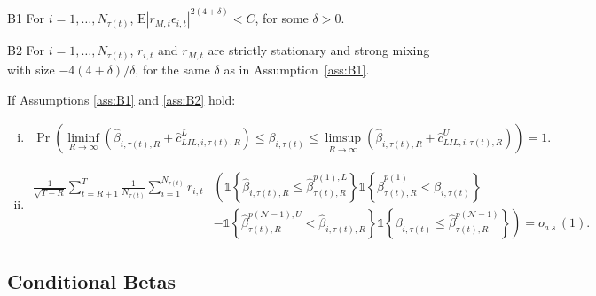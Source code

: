 \begin{namedassumption}{B1}\label{ass:B1}
For $i=1,\ldots,N_{\tau(t)}$, $\mathrm{E}\left|r_{M,t}\epsilon_{i,t}\right|^{2(4+\delta)}<C$, for some $\delta>0$.
\end{namedassumption}

\begin{namedassumption}{B2}\label{ass:B2}
For $i=1,\ldots,N_{\tau(t)}$, $r_{i,t}$ and $r_{M,t}$ are strictly stationary
and strong mixing with size $-4(4+\delta)/\delta$, for the same $\delta$ as in
Assumption~\ref{ass:B1}.
\end{namedassumption}

\begin{propositionB}\label{prop:B}
If Assumptions \ref{ass:B1} and \ref{ass:B2} hold:
\begin{enumerate}[(i)]
\item
\begin{align*}
\Pr\!\left( \liminf_{R\to\infty} \left(\widehat{\beta}_{i,\tau(t),R}+\widehat{c}^{L}_{LIL,i,\tau(t),R}\right) \le \beta_{i,\tau(t)} \le \limsup_{R\to\infty} \left(\widehat{\beta}_{i,\tau(t),R}+\widehat{c}^{U}_{LIL,i,\tau(t),R}\right) \right)=1.
\end{align*}

\item
\begin{align*}
    \frac{1}{\sqrt{T-R}}\sum_{t=R+1}^{T} \frac{1}{N_{\tau(t)}}\sum_{i=1}^{N_{\tau(t)}} r_{i,t} &\left( \mathds{1}\!\left\{ \widehat{\beta}_{i,\tau(t),R} \leq \widehat{\beta}_{\tau(t),R}^{p(1),L} \right\} \mathds{1}\!\left\{ \widehat{\beta}_{\tau(t),R}^{p(1)} < \beta_{i,\tau(t)} \right\} \right. \\
    &\left. - \mathds{1} \left\{ \widehat{\beta}_{\tau(t),R}^{p(\mathcal N-1),U} < \widehat{\beta}_{i,\tau(t),R} \right\} \mathds{1}\!\left\{ \beta_{i,\tau(t)} \leq \widehat{\beta}_{\tau(t),R}^{p(\mathcal N-1)} \right\} \right) = o_{a.s.}(1).
\end{align*}
\end{enumerate}
\end{propositionB}

\subsection{Conditional Betas}

